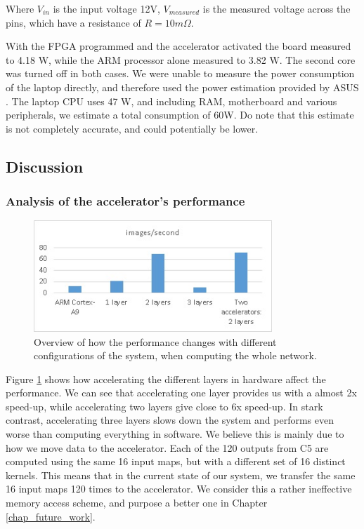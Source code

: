 Where $ V_{in} $ is the input voltage 12V, $ V_{measured} $ is the measured voltage across the pins, which have a resistance of $ R = 10m\Omega $.

With the FPGA programmed and the accelerator activated the board measured to 4.18 W, while the ARM processor alone measured to 3.82 W. The second core was turned off in both cases. We were unable to measure the power consumption of the laptop directly, and therefore used the power estimation provided by ASUS \cite{ASUS2015}. The laptop CPU uses 47 W, and including RAM, motherboard and various peripherals, we estimate a total consumption of 60W. Do note that this estimate is not completely accurate, and could potentially be lower. 


\subsection{Discussion} \label{sec_result_discussion}

\subsubsection{Analysis of the accelerator's performance}

\begin{figure}[h!]
	\centering
	\includegraphics[width=0.8\textwidth]{Figures/Results/results_acc_improvements}
	\caption[Accelerator performance]{Overview of how the performance changes with different configurations of the system, when computing the whole network.}
	\label{fig_results_acc_improvements}
\end{figure}

Figure \ref{fig_results_acc_improvements} shows how accelerating the different layers in hardware affect the performance. We can see that accelerating one layer provides us with a almost 2x speed-up, while accelerating two layers give close to 6x speed-up. In stark contrast, accelerating three layers slows down the system and performs even worse than computing everything in software. We believe this is mainly due to how we move data to the accelerator. Each of the 120 outputs from C5 are computed using the same 16 input maps, but with a different set of 16 distinct kernels. This means that in the current state of our system, we transfer the same 16 input maps 120 times to the accelerator. We consider this a rather ineffective memory access scheme, and purpose a better one in Chapter \ref{chap_future_work}.


